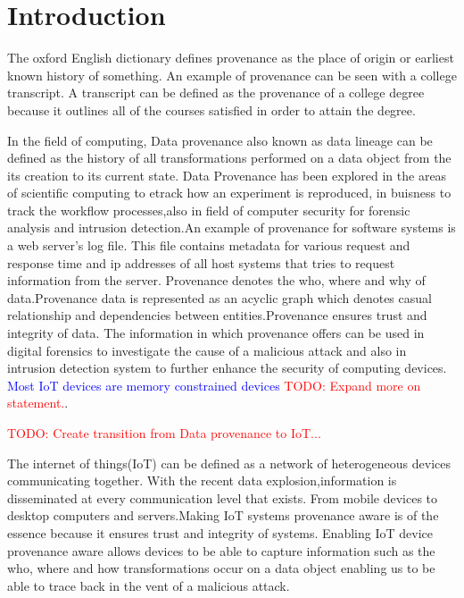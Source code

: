 \chapter{Introduction}\label{chapter:introduction}
The oxford English dictionary defines provenance as the place of origin or earliest known history of something. An example of provenance can be seen with a college transcript. A transcript can be defined as the provenance of a college degree because it outlines all of the courses satisfied in order to attain the degree.

\par In the field of computing, Data provenance also known as data lineage can be defined as the history of all transformations performed on a data object from the its creation to its current state. Data Provenance has been explored in the areas of scientific computing to etrack how an experiment is reproduced, in buisness to track the workflow processes,also in field of computer security for forensic analysis and intrusion detection.An example of provenance for software systems is a web server's log file. This file contains metadata for various request and response time and ip addresses of all host systems that tries to request information from the server. Provenance denotes the who, where and why of data.Provenance data is represented as an acyclic graph which denotes casual relationship and dependencies between entities.Provenance ensures trust and integrity of data. The information in which provenance offers can be used in digital forensics to investigate the cause of a malicious attack and also in intrusion detection system to further enhance the security of computing devices.  \textcolor{blue}{Most IoT devices are memory constrained devices} \textcolor{red}{TODO: Expand more on statement.}.

 
\textcolor{red}{TODO: Create transition from Data provenance to IoT...}


The internet of things(IoT) can be defined as a network of heterogeneous devices communicating together. With the recent data explosion,information is disseminated at every communication level that exists. From mobile devices to desktop computers and servers.Making IoT systems provenance aware is of the essence because it ensures trust and  integrity of systems. Enabling IoT device provenance aware allows devices to be able to capture information such as the who, where and how transformations occur on a data object enabling us to be able to trace back in the vent of a malicious attack.



